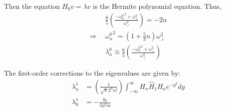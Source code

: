 Then the equation $H_0v=\lambda v$ is the Hermite polynomial equation. Thus,
\begin{align}
&\frac{6}{5}\left(\frac{-{\omega_n^0}^2+\omega_\perp^2}{\omega_\perp^2}\right) = -2n \\
\Rightarrow \ \ &{\omega_n^0}^2 = \left(1+\frac{5}{3}n\right)\omega_\perp^2 \\
&\lambda_n^0 \equiv \frac{6}{5}\left(\frac{-{\omega_n^0}^2+\omega_\perp^2}{\omega_\perp^2}\right)
\end{align}

The first-order corrections to the eigenvalues are given by:
\begin{align}
\lambda_n^1 &= \left(\frac{1}{\sqrt{\pi}2^nn!}\right) \int_{-\infty}^\infty H_n\hat{H}_1H_ne^{-y^2}dy \\
\lambda_0^1 &= -\frac{9\varepsilon}{5\eta^2m}
\end{align}


